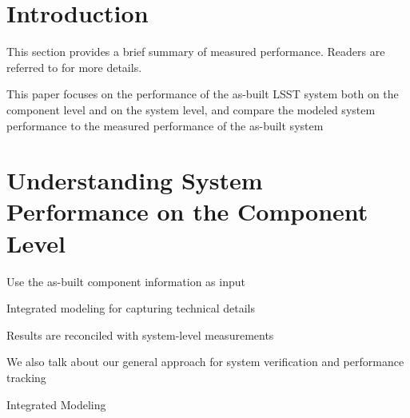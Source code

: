 \section{Introduction}

This section provides a brief summary of measured performance. Readers are referred to \cite{PSTN-004} for more details.

This paper focuses on the performance of the as-built LSST system both on the component level and on the system level, and compare the modeled system performance to the measured performance of the as-built system

\section{Understanding System Performance on the Component Level}

Use the as-built component information as input

Integrated modeling for capturing technical details

Results are reconciled with system-level measurements

We also talk about our general approach for system verification and performance tracking






Integrated Modeling




